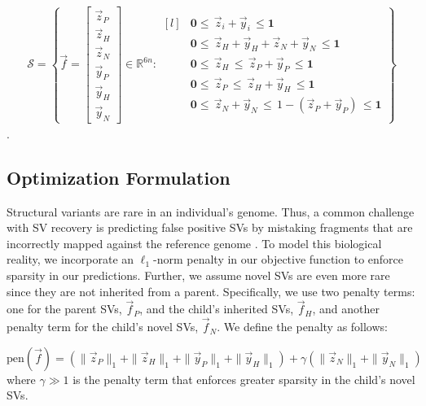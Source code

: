 \documentclass{article}
\def\R{\mathbb{R}} %
\newcommand{\fP}{\vec{f}_P }
\newcommand{\fH}{\vec{f}_H }
\newcommand{\fN}{\vec{f}_N }
\newcommand{\zP}{\vec{z}_P }
\newcommand{\zH}{\vec{z}_H }
\newcommand{\zN}{\vec{z}_N }
\newcommand{\yP}{\vec{y}_P }
\newcommand{\yH}{\vec{y}_H }
\newcommand{\yN}{\vec{y}_N }
\begin{document}
\begin{align*}
	\mathcal{S} = \left\{
	\vec{f} = 
	\begin{bmatrix}
		\zP \\ \zH \\ \zN \\ \yP \\ \yH \\ \yN 
	\end{bmatrix} \in \R^{6n} : 
	\begin{matrix*}[l]
		&\mathbf{0} \leq \, \vec{z}_i + \vec{y}_i \, \leq \mathbf{1}\\
		& \mathbf{0} \leq \, \zH + \yH + \zN + \yN \, \leq \mathbf{1}\\
		&\mathbf{0} \leq \, \zH   \, \leq \, \zP + \yP  \, \leq \mathbf{1}\\
		&\mathbf{0} \leq \, \zP   \, \leq \, \zH + \yH  \, \leq \mathbf{1}\\
		&\mathbf{0} \leq \, \zN + \yN   \, \leq \, 1- (\zP +\yP)  \, \leq \mathbf{1}
	\end{matrix*}
	\right\}
\end{align*}. 

\subsection{Optimization Formulation}
Structural variants are rare in an individual's genome. Thus, a common challenge with SV recovery is predicting false positive SVs by mistaking fragments that are incorrectly mapped against the reference genome \cite{MB_diploidTrios}. To model this biological reality, we incorporate an $\ell_1$-norm penalty in our objective function to enforce sparsity in our predictions. Further, we assume novel SVs are even more rare since they are not inherited from a parent. Specifically, we use two penalty terms: one for the parent SVs, $\fP$, and the child's inherited SVs, $\fH$, and another penalty term for the child's novel SVs, $\fN$. We define the penalty as follows:

\begin{equation*}
	\text{pen}(\vec{f}) = (\|\zP\|_1 + \|\zH\|_1 + \|\yP\|_1 + \|\yH\|_1) + \gamma (\|\zN\|_1 + \|\yN\|_1)
\end{equation*}
where $\gamma \gg 1$ is the penalty term that enforces greater sparsity in the child's novel SVs. \\
\end{document}
